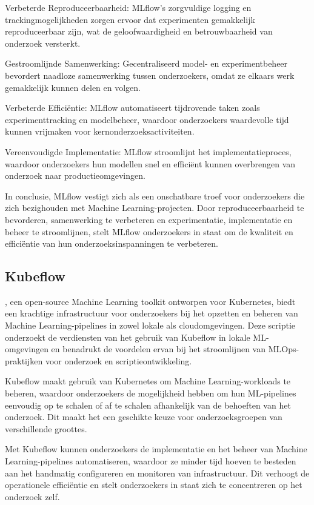 Verbeterde Reproduceerbaarheid: MLflow's zorgvuldige logging en trackingmogelijkheden zorgen ervoor dat experimenten gemakkelijk reproduceerbaar zijn, wat de geloofwaardigheid en betrouwbaarheid van onderzoek versterkt.

Gestroomlijnde Samenwerking: Gecentraliseerd model- en experimentbeheer bevordert naadloze samenwerking tussen onderzoekers, omdat ze elkaars werk gemakkelijk kunnen delen en volgen.

Verbeterde Efficiëntie: MLflow automatiseert tijdrovende taken zoals experimenttracking en modelbeheer, waardoor onderzoekers waardevolle tijd kunnen vrijmaken voor kernonderzoeksactiviteiten.

Vereenvoudigde Implementatie: MLflow stroomlijnt het implementatieproces, waardoor onderzoekers hun modellen snel en efficiënt kunnen overbrengen van onderzoek naar productieomgevingen.

In conclusie, MLflow vestigt zich als een onschatbare troef voor onderzoekers die zich bezighouden met Machine Learning-projecten. Door reproduceerbaarheid te bevorderen, samenwerking te verbeteren en experimentatie, implementatie en beheer te stroomlijnen, stelt MLflow onderzoekers in staat om de kwaliteit en efficiëntie van hun onderzoeksinspanningen te verbeteren.

\subsection{Kubeflow}

\textcite{Kubeflow2021}, een open-source Machine Learning toolkit ontworpen voor Kubernetes, biedt een krachtige infrastructuur voor onderzoekers bij het opzetten en beheren van Machine Learning-pipelines in zowel lokale als cloudomgevingen. Deze scriptie onderzoekt de verdiensten van het gebruik van Kubeflow in lokale ML-omgevingen en benadrukt de voordelen ervan bij het stroomlijnen van MLOps-praktijken voor onderzoek en scriptieontwikkeling.

Kubeflow maakt gebruik van Kubernetes om Machine Learning-workloads te beheren, waardoor onderzoekers de mogelijkheid hebben om hun ML-pipelines eenvoudig op te schalen of af te schalen afhankelijk van de behoeften van het onderzoek. Dit maakt het een geschikte keuze voor onderzoeksgroepen van verschillende groottes.

Met Kubeflow kunnen onderzoekers de implementatie en het beheer van Machine Learning-pipelines automatiseren, waardoor ze minder tijd hoeven te besteden aan het handmatig configureren en monitoren van infrastructuur. Dit verhoogt de operationele efficiëntie en stelt onderzoekers in staat zich te concentreren op het onderzoek zelf.

